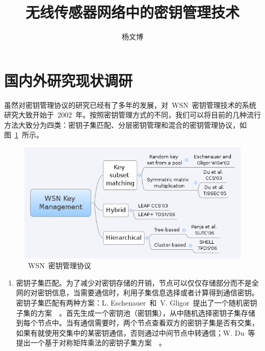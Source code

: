 \documentclass[a4paper,10pt]{article}
\title{无线传感器网络中的密钥管理技术}
\author{杨文博}
\begin{document}
\maketitle

\section{国内外研究现状调研}

虽然对密钥管理协议的研究已经有了多年的发展，对~WSN~密钥管理技术的系统研究大致开始于~2002~年。按照密钥管理方式的不同，我们可以将目前的几种流行方法大致分为四类：密钥子集匹配、分层密钥管理和混合的密钥管理协议，如图~\ref{wsn_keyman_1}~所示。

\begin{figure}[htbp]
  \centering
  \includegraphics[width=.9\textwidth,keepaspectratio]{wsn_keyman_1}
  \caption{\label{wsn_keyman_1}~WSN~密钥管理协议}
\end{figure}

\begin{enumerate}

\item 密钥子集匹配。为了减少对密钥存储的开销，节点可以仅仅存储部分而不是全网的对密钥信息，当需要通信时，利用子集信息选择或者计算得到通信密钥。密钥子集匹配有两种方案：L. Eschenauer~和~V. Gligor~提出了一个随机密钥子集的方案~\cite{Eschenauer2002}~。首先生成一个密钥池（密钥集），从中随机选择密钥子集存储到每个节点中。当有通信需要时，两个节点查看双方的密钥子集是否有交集，如果有就使用交集中的某密钥通信，否则通过中间节点中转通信；W. Du~等提出一个基于对称矩阵乘法的密钥子集方案~\cite{Du2003}~。

\end{enumerate}


\cite{Perrig2002}



\end{document}
